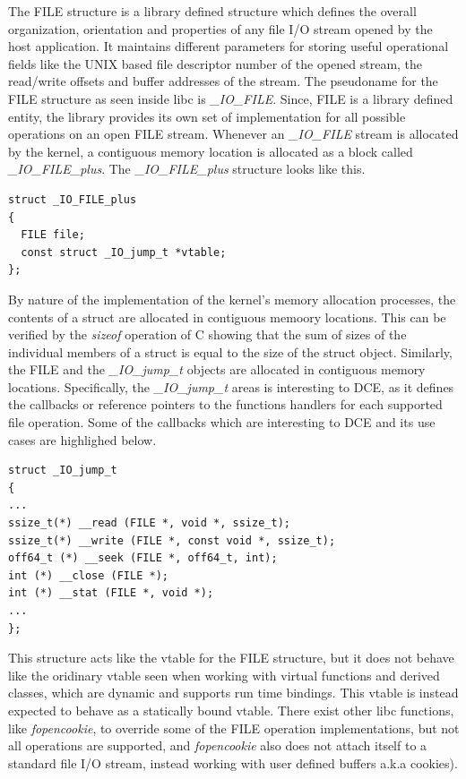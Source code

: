 \documentclass{sig-alternate}
\begin{document}
The FILE structure is a library defined structure which defines the overall organization, orientation and properties of any file I/O stream opened
by the host application. It maintains different parameters for storing useful operational fields like the UNIX based file descriptor number of the 
opened stream, the read/write offsets and buffer addresses of the stream. The pseudoname for the FILE structure as seen inside libc is \textit{\_IO\_FILE}. 
Since, FILE is a library defined entity, the library provides its own set of implementation for all possible operations on an open FILE stream.
Whenever an \textit{\_IO\_FILE} stream is allocated by the kernel, a contiguous memory location is allocated as a block called \textit{\_IO\_FILE\_plus}. 
The \textit{\_IO\_FILE\_plus} structure looks like this.

\begin{lstlisting}[style=CStyle]     
struct _IO_FILE_plus
{
  FILE file;
  const struct _IO_jump_t *vtable;
};
\end{lstlisting}

By nature of the implementation of the kernel's memory allocation processes, the contents of a struct are allocated in contiguous memoory locations. 
This can be verified by the \textit{sizeof} operation of C showing that the sum of sizes of the individual members of a struct is equal to the size of
the struct object. Similarly, the FILE and the \textit{\_IO\_jump\_t} objects are allocated in contiguous memory locations. Specifically, the 
\textit{\_IO\_jump\_t} areas is interesting to DCE, as it defines the callbacks or reference pointers to the functions handlers for each supported file 
operation. Some of the callbacks which are interesting to DCE and its use cases are highlighed below.

\begin{lstlisting}[style=CStyle]     
struct _IO_jump_t
{
...
ssize_t(*) __read (FILE *, void *, ssize_t);
ssize_t(*) __write (FILE *, const void *, ssize_t);
off64_t (*) __seek (FILE *, off64_t, int);
int (*) __close (FILE *);
int (*) __stat (FILE *, void *);
...
};
\end{lstlisting}

This structure acts like the vtable for the FILE structure, but it does not behave like the oridinary vtable seen when working with virtual functions 
and derived classes, which are dynamic and supports run time bindings. This vtable is instead expected to behave as a statically bound vtable.  There exist 
other libc functions, like \textit{fopencookie}, to override some of the FILE operation implementations, but not all operations are supported, and 
\textit{fopencookie} also does not attach itself to a standard file I/O stream, 
instead working with user defined buffers a.k.a cookies). 
\end{document}
